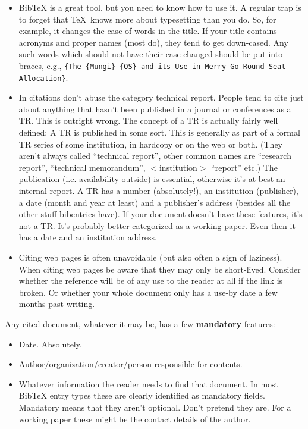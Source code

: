 \begin{itemize}
\item BibTeX is a great tool, but you need to know how to use it. A regular trap is to forget that \TeX~knows more about typesetting than you do. So, for example, it changes the case of words in the title. If your title contains acronyms and proper names (most do), they tend to get down-cased. Any such words which should not have their case changed should be put into braces, e.g., \verb|{The {Mungi} {OS} and its Use in Merry-Go-Round Seat Allocation}|.


\item In citations don't abuse the category technical report. People tend to cite just about anything that hasn't been published in a journal or conferences as a TR. This is outright wrong. The concept of a TR is actually fairly well defined: A TR is published in some sort. This is generally as part of a formal TR series of some institution, in hardcopy or on the web or both. (They aren't always called ``technical report'', other common names are ``research report'', ``technical memorandum'', $<$institution$>$ ``report'' etc.) The publication (i.e. availability outside) is essential, otherwise it's at best an internal report.
A TR has a number (absolutely!), an institution (publisher), a date (month and year at least) and a publisher's address (besides all the other stuff bibentries have).
If your document doesn't have these features, it's not a TR. It's probably better categorized as a working paper. Even then it has a date and an institution address.

\item Citing web pages is often unavoidable (but also often a sign of laziness). When citing web pages be aware that they may only be short-lived. Consider whether the reference will be of any use to the reader at all if the link is broken. Or whether your whole document only has a use-by date a few months past writing.

\end{itemize}

Any cited document, whatever it may be, has a few \textbf{mandatory} features:
\begin{itemize}
	\item Date. Absolutely. 
	\item Author/organization/creator/person responsible for contents.
	\item Whatever information the reader needs to find that document. In most BibTeX entry types these are clearly identified as mandatory fields. Mandatory means that they aren't optional. Don't pretend they are. For a working paper these might be the contact details of the author.
\end{itemize}



